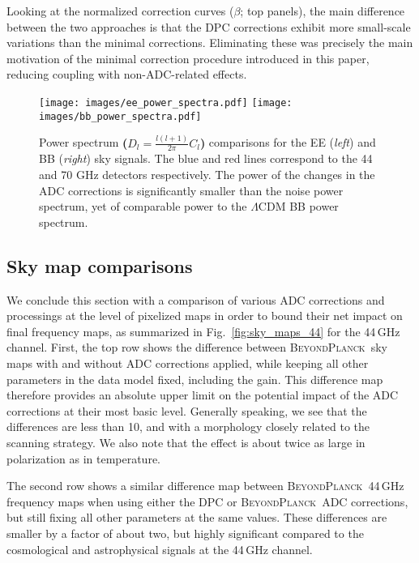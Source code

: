 \documentclass[twocolumn]{aa}
\newcommand{\BP}{\textsc{BeyondPlanck}}
\begin{document}
Looking at the normalized correction curves ($\beta$; top panels), the main difference between the two approaches is that the DPC corrections exhibit more small-scale variations than the minimal corrections. Eliminating these was precisely the main motivation of the minimal correction procedure introduced in this paper, reducing coupling with non-ADC-related effects.

\begin{figure*}
\texttt{[image: images/ee\_power\_spectra.pdf]}
\texttt{[image: images/bb\_power\_spectra.pdf]}
\caption{Power spectrum \textbf{($D_l = \frac{l(l+1)}{2\pi}C_l$)} comparisons for the EE (\textit{left}) and BB (\textit{right}) sky signals. The blue and red lines correspond to the 44 and 70 GHz detectors respectively. The power of the changes in the ADC corrections is significantly smaller than the noise power spectrum, yet of comparable power to the $\Lambda$CDM BB power spectrum.}\label{fig:ps}
\end{figure*}

\subsection{Sky map comparisons}\label{sub:sky_maps}

We conclude this section with a comparison of various ADC corrections and processings at the level of pixelized maps in order to bound their net impact on final frequency maps, as summarized in Fig.~\ref{fig:sky_maps_44} for the 44\,GHz channel. First, the top row shows the difference between \BP\ sky maps with and without ADC corrections applied, while keeping all other parameters in the data model fixed, including the gain. This difference map therefore provides an absolute upper limit on the potential impact of the ADC corrections at their most basic level. Generally speaking, we see that the differences are less than 10\muK, and with a morphology closely related to the scanning strategy. We also note that the effect is about twice as large in polarization as in temperature.

The second row shows a similar difference map between \BP\ 44\,GHz frequency maps when using either the DPC or \BP\ ADC corrections, but still fixing all other parameters at the same values. These differences are smaller by a factor of about two, but highly significant compared to the cosmological and astrophysical signals at the 44\,GHz channel. 
\end{document}
